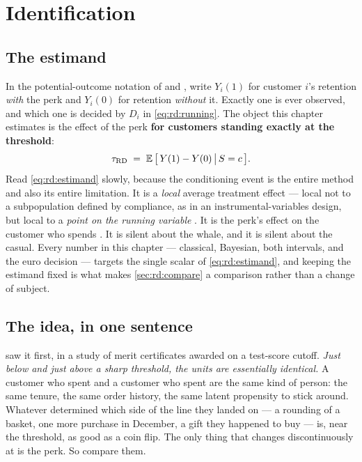 \section{Identification}
\label{sec:rd:ident}

\subsection*{The estimand}

In the potential-outcome notation of \citet{rubin1974} and \citet{imbens2015}, write $Y_i(1)$ for
customer $i$'s retention \emph{with} the perk and $Y_i(0)$ for retention \emph{without} it. Exactly
one is ever observed, and which one is decided by $D_i$ in \cref{eq:rd:running}. The object this
chapter estimates is the effect of the perk \textbf{for customers standing exactly at the
threshold}:
%
\begin{equation}
  \tau_{\mathrm{RD}} \;=\; \operatorname{\mathbb{E}}\big[\,Y(1) - Y(0) \,\big|\, S = c \,\big].
  \label{eq:rd:estimand}
\end{equation}
%
Read \cref{eq:rd:estimand} slowly, because the conditioning event is the entire method and also its
entire limitation. It is a \emph{local} average treatment effect --- local not to a subpopulation
defined by compliance, as in an instrumental-variables design, but local to a \emph{point on the
running variable} \citep{hahn2001, imbens2008}. It is the perk's effect on the customer who spends
\eur{\nbNineCutoff}. It is silent about the  whale, and it is silent about the 
casual. Every number in this chapter --- classical, Bayesian, both intervals, and the euro decision
--- targets the single scalar of \cref{eq:rd:estimand}, and keeping the estimand fixed is what makes
\cref{sec:rd:compare} a comparison rather than a change of subject.

\subsection*{The idea, in one sentence}

 saw it first, in a study of merit certificates awarded on a test-score
cutoff. \emph{Just below and just above a sharp threshold, the units are essentially identical.} A
customer who spent  and a customer who spent  are the same kind of person: the same
tenure, the same order history, the same latent propensity to stick around. Whatever determined
which side of the line they landed on --- a rounding of a basket, one more purchase in December, a
gift they happened to buy --- is, near the threshold, as good as a coin flip. The only thing that
changes discontinuously at \eur{\nbNineCutoff} is the perk. So compare them.

